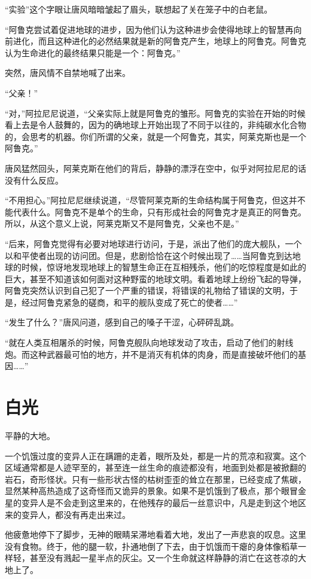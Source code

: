 “实验”这个字眼让唐风暗暗皱起了眉头，联想起了关在笼子中的白老鼠。

“阿鲁克尝试着促进地球的进步，因为他们认为这种进步会使得地球上的智慧再向前进化，而且这种进化的必然结果就是新的阿鲁克产生，地球上的阿鲁克。阿鲁克认为生命进化的最终结果只能是一个：阿鲁克。”

突然，唐风情不自禁地喊了出来。

“父亲！”

“对，”阿拉尼尼说道，“父亲实际上就是阿鲁克的雏形。阿鲁克的实验在开始的时候看上去是令人鼓舞的，因为的确地球上开始出现了不同于以往的，非纯碳水化合物的，会思考的机器。你们所谓的父亲，就是一个阿鲁克，其实，阿莱克斯也是一个阿鲁克。”

唐风猛然回头，阿莱克斯在他们的背后，静静的漂浮在空中，似乎对阿拉尼尼的话没有什么反应。

“不用担心。”阿拉尼尼继续说道，“尽管阿莱克斯的生命结构属于阿鲁克，但这并不能代表什么。阿鲁克不是单个的生命，只有形成社会的阿鲁克才是真正的阿鲁克。所以，从这个意义上说，阿莱克斯又不是阿鲁克，父亲也不是。”

“后来，阿鲁克觉得有必要对地球进行访问，于是，派出了他们的庞大舰队，一个以和平使者出现的访问团。但是，悲剧恰恰在这个时候出现了……当阿鲁克到达地球的时候，惊讶地发现地球上的智慧生命正在互相残杀，他们的吃惊程度是如此的巨大，甚至不知道该如何面对这种野蛮的地球文明。看着地球上纷纷飞起的导弹，阿鲁克突然认识到自己犯了一个严重的错误，将错误的礼物给了错误的文明，于是，经过阿鲁克紧急的磋商，和平的舰队变成了死亡的使者……”

“发生了什么？”唐风问道，感到自己的嗓子干涩，心砰砰乱跳。

“就在人类互相屠杀的时候，阿鲁克舰队向地球发动了攻击，启动了他们的射线炮。而这种武器最可怕的地方，并不是消灭有机体的肉身，而是直接破坏他们的基因……”

\chapter{白光}

平静的大地。

一个饥饿过度的变异人正在蹒跚的走着，眼所及处，都是一片的荒凉和寂寞。这个区域通常都是人迹罕至的，甚至连一丝生命的痕迹都没有，地面到处都是被掀翻的岩石，奇形怪状。只有一些形状古怪的枯树歪歪的耸立在那里，已经变成了焦碳，显然某种高热造成了这奇怪而又诡异的景象。如果不是饥饿到了极点，那个眼冒金星的变异人是不会走到这里来的，在他残存的最后一丝意识中，凡是走到这个地区来的变异人，都没有再走出来过。

他疲惫地停下了脚步，无神的眼睛呆滞地看着大地，发出了一声悲哀的叹息。这里没有食物。终于，他的腿一软，扑通地倒了下去，由于饥饿而干瘪的身体像稻草一样轻，甚至没有溅起一星半点的灰尘。又一个生命就这样静静的消亡在这苍凉的大地上了。

